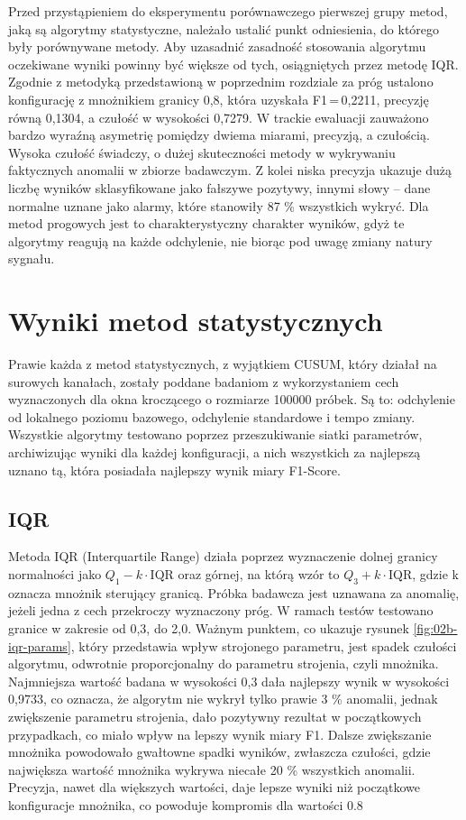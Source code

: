 \documentclass[a4paper,twoside,12pt]{book}
\begin{document}
	Przed przystąpieniem do eksperymentu porównawczego pierwszej grupy metod, jaką są algorytmy statystyczne, należało ustalić punkt odniesienia, do którego były porównywane metody. Aby uzasadnić zasadność stosowania algorytmu oczekiwane wyniki powinny być większe od tych, osiągniętych przez metodę IQR. Zgodnie z metodyką przedstawioną w poprzednim rozdziale za próg ustalono konfigurację z mnożnikiem granicy 0{,}8, która uzyskała F1\,=\,0{,}2211, precyzję równą 0{,}1304, a czułość w wysokości 0{,}7279.
	W trackie ewaluacji zauważono bardzo wyraźną asymetrię pomiędzy dwiema miarami, precyzją, a czułością. Wysoka czułość świadczy, o dużej skuteczności metody w wykrywaniu faktycznych anomalii w zbiorze badawczym. Z kolei niska precyzja ukazuje dużą liczbę wyników sklasyfikowane jako fałszywe pozytywy, innymi słowy – dane normalne uznane jako alarmy, które stanowiły  87 \% wszystkich wykryć. Dla metod progowych jest to charakterystyczny charakter wyników, gdyż te algorytmy reagują na każde odchylenie, nie biorąc pod uwagę zmiany natury sygnału. 
	
	\section{Wyniki metod statystycznych}
	Prawie każda z metod statystycznych, z wyjątkiem CUSUM, który działał na surowych kanałach, zostały poddane badaniom z wykorzystaniem cech wyznaczonych dla okna kroczącego o rozmiarze 100000 próbek. Są to: odchylenie od lokalnego poziomu bazowego, odchylenie standardowe i tempo zmiany. Wszystkie algorytmy testowano poprzez przeszukiwanie siatki parametrów, archiwizując wyniki dla każdej konfiguracji, a nich wszystkich za najlepszą uznano tą, która posiadała najlepszy wynik miary F1-Score.
	
	\subsection{IQR}
	Metoda IQR (Interquartile Range) działa poprzez wyznaczenie dolnej granicy normalności jako 
	$Q_1 - k \cdot \text{IQR}$
	oraz górnej, na którą wzór to 
	$Q_3 + k \cdot \text{IQR}$, gdzie k oznacza mnożnik sterujący granicą. Próbka badawcza jest uznawana za anomalię, jeżeli jedna z cech przekroczy wyznaczony próg. W ramach testów testowano granice w zakresie od 0,3, do 2{,}0. Ważnym punktem, co ukazuje rysunek \ref{fig:02b-iqr-params}, który przedstawia wpływ strojonego parametru, jest spadek czułości algorytmu, odwrotnie proporcjonalny do parametru strojenia, czyli mnożnika. Najmniejsza wartość badana w wysokości 0{,}3 dała najlepszy wynik w wysokości 0{,}9733, co oznacza, że algorytm nie wykrył tylko prawie 3 \% anomalii, jednak zwiększenie parametru strojenia, dało pozytywny rezultat w początkowych przypadkach, co miało wpływ na lepszy wynik miary F1. Dalsze zwiększanie mnożnika powodowało gwałtowne spadki wyników, zwłaszcza czułości, gdzie największa wartość mnożnika wykrywa niecałe 20 \% wszystkich anomalii. Precyzja, nawet dla większych wartości, daje lepsze wyniki niż początkowe konfiguracje mnożnika, co powoduje kompromis dla wartości 0.8
	
\end{document}
